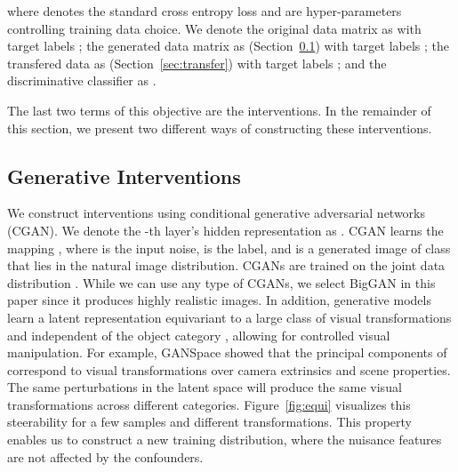 \documentclass[final]{cvpr}
\begin{document}
where  denotes the standard cross entropy loss and  are hyper-parameters controlling training data choice.  We denote the original data matrix as  with target labels ; the generated data matrix as  (Section~\ref{method:genint}) with target labels ; the transfered data as  (Section~\ref{sec:transfer}) with target labels ; and the discriminative classifier as . 

The last two terms of this objective are the interventions. In the remainder of this section, we present two different ways of constructing these interventions.

\subsection{Generative Interventions}\label{method:genint}



We construct interventions using conditional generative adversarial networks (CGAN). We denote the -th layer's hidden representation as . CGAN learns the mapping , where  is the input noise,  is the label, and  is a generated image of class  that lies in the natural image distribution. CGANs are trained on the joint data distribution . While we can use any type of CGANs, we select BigGAN \cite{BigGAN} in this paper since it produces highly realistic images. In addition, generative models learn a latent representation  equivariant to a large class of visual transformations and independent of the object category \cite{hrknen2020ganspace, jahanian2019steerability}, allowing for controlled visual manipulation.
For example, GANSpace \cite{hrknen2020ganspace} showed that the principal components of  correspond to visual transformations over camera extrinsics and scene properties. The same perturbations in the latent space will produce the same visual transformations across different categories. Figure~\ref{fig:equi} visualizes this steerability for a few samples and different transformations. 
This property enables us to construct a new training distribution, where the nuisance features  are not affected by the confounders. 
\end{document}

